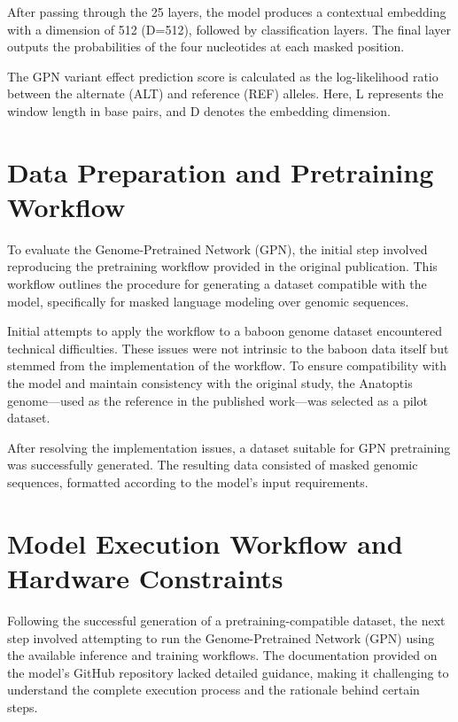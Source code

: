 \documentclass[
  a4paper,
]{scrbook}
\begin{document}
After passing through the 25 layers, the model produces a contextual
embedding with a dimension of 512 (D=512), followed by classification
layers. The final layer outputs the probabilities of the four
nucleotides at each masked position.

The GPN variant effect prediction score is calculated as the
log-likelihood ratio between the alternate (ALT) and reference (REF)
alleles. Here, L represents the window length in base pairs, and D
denotes the embedding dimension.

\chapter{Data Preparation and Pretraining
Workflow}\label{data-preparation-and-pretraining-workflow}

To evaluate the Genome-Pretrained Network (GPN), the initial step
involved reproducing the pretraining workflow provided in the original
publication. This workflow outlines the procedure for generating a
dataset compatible with the model, specifically for masked language
modeling over genomic sequences.

Initial attempts to apply the workflow to a baboon genome dataset
encountered technical difficulties. These issues were not intrinsic to
the baboon data itself but stemmed from the implementation of the
workflow. To ensure compatibility with the model and maintain
consistency with the original study, the Anatoptis genome---used as the
reference in the published work---was selected as a pilot dataset.

After resolving the implementation issues, a dataset suitable for GPN
pretraining was successfully generated. The resulting data consisted of
masked genomic sequences, formatted according to the model's input
requirements.

\chapter{Model Execution Workflow and Hardware
Constraints}\label{model-execution-workflow-and-hardware-constraints}

Following the successful generation of a pretraining-compatible dataset,
the next step involved attempting to run the Genome-Pretrained Network
(GPN) using the available inference and training workflows. The
documentation provided on the model's GitHub repository lacked detailed
guidance, making it challenging to understand the complete execution
process and the rationale behind certain steps.
\end{document}
